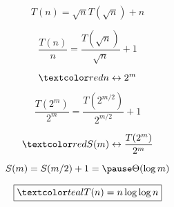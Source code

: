 \begin{frame}{}
  \[
    \boxed{T(n) = \sqrt{n} T(\sqrt{n}) + n}
  \]

  \pause
  \[
    \frac{T(n)}{n} = \frac{T(\sqrt{n})}{\sqrt{n}} + 1
  \]

  \pause
  \[
    \red{n \leftrightarrow 2^m}
  \]

  \pause
  \[
    \frac{T(2^m)}{2^m} = \frac{T(2^{m/2})}{2^{m/2}} + 1
  \]

  \pause
  \[
    \red{S(m) \leftrightarrow \frac{T(2^m)}{2^m}}
  \]

  \pause
  \[
    S(m) = S(m/2) + 1 = \pause \Theta(\log m)
  \]

  \pause
  \vspace{-0.60cm}
  \[
    \boxed{\teal{T(n) = n \log \log n}}
  \]
\end{frame}
